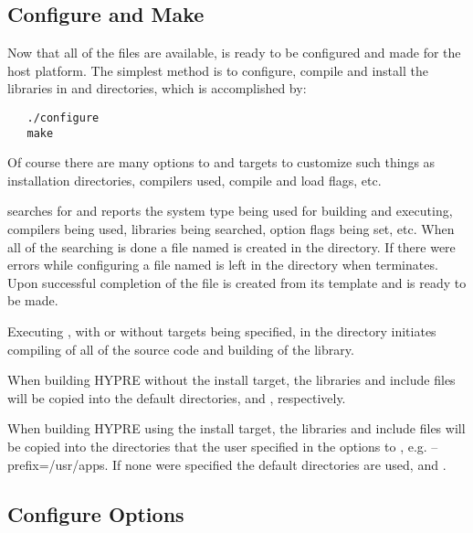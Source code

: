 \subsection{Configure and Make}
\label{Configure and Make}

Now that all of the files are available, \hypre{} is ready to be configured and 
made for the host platform.  The simplest method is to configure, compile and
install the libraries in  and  directories, which is
accomplished by:
\begin{verbatim}
   ./configure
   make
\end{verbatim}

Of course there are many options to  and  targets to 
customize such things as installation directories, compilers used, compile and
load flags, etc.  

 searches for and reports the system type being used for building 
and executing, compilers being used, libraries being searched, option flags being set,
etc.  When all of the searching is done a file named  is created 
in the  directory.  If there were errors while configuring a file named 
 is left in the  directory when  terminates. 
Upon successful completion of  the file  
is created from its template  and \hypre{} is ready to be made.

Executing , with or without targets being specified, in the  directory 
initiates compiling of all of the source code and building of the \hypre{} library. 

When building HYPRE without the install target, the libraries and include files will be copied
into the default directories,  and , respectively.

When building HYPRE using the install target, the libraries and include files will be copied
into the directories that the user specified in the options to ,
e.g. --prefix=/usr/apps.  If none were specified the default directories are used,
 and .

\subsection{Configure Options}
\label{Configure Options}

